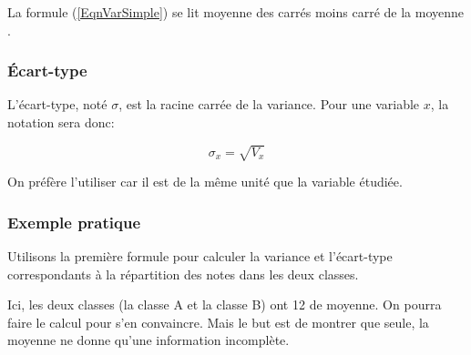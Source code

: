 \documentclass[a4paper,12pt]{scrartcl}
\begin{document}
La formule (\ref{EqnVarSimple}) se lit \og moyenne des carrés moins carré de la moyenne \fg{}.

\subsubsection{Écart-type}

L'écart-type, noté $\sigma$, est la racine carrée de la variance. Pour une variable $x$, la notation sera donc: 

\begin{equation}
\sigma_x = \sqrt{V_x}
\end{equation}

On préfère l'utiliser car il est de la même unité que la variable étudiée.

\subsubsection{Exemple pratique}

Utilisons la première formule pour calculer la variance et l'écart-type correspondants à la répartition des notes dans les deux classes. 

Ici, les deux classes (la classe A et la classe B) ont 12 de moyenne. On pourra faire le calcul pour s'en convaincre. Mais le but est de montrer que seule, la moyenne ne donne qu'une information incomplète. 
\end{document}
